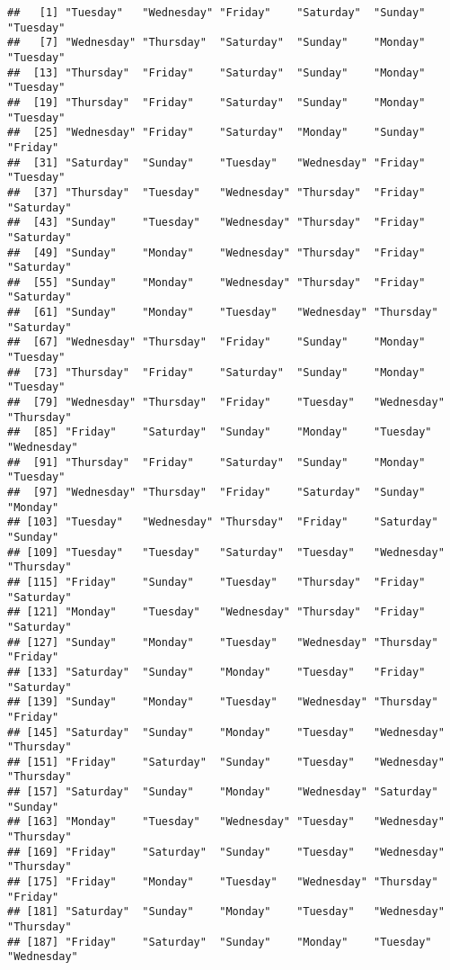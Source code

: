 \documentclass[
]{article}
\begin{document}
\begin{verbatim}
##   [1] "Tuesday"   "Wednesday" "Friday"    "Saturday"  "Sunday"    "Tuesday"  
##   [7] "Wednesday" "Thursday"  "Saturday"  "Sunday"    "Monday"    "Tuesday"  
##  [13] "Thursday"  "Friday"    "Saturday"  "Sunday"    "Monday"    "Tuesday"  
##  [19] "Thursday"  "Friday"    "Saturday"  "Sunday"    "Monday"    "Tuesday"  
##  [25] "Wednesday" "Friday"    "Saturday"  "Monday"    "Sunday"    "Friday"   
##  [31] "Saturday"  "Sunday"    "Tuesday"   "Wednesday" "Friday"    "Tuesday"  
##  [37] "Thursday"  "Tuesday"   "Wednesday" "Thursday"  "Friday"    "Saturday" 
##  [43] "Sunday"    "Tuesday"   "Wednesday" "Thursday"  "Friday"    "Saturday" 
##  [49] "Sunday"    "Monday"    "Wednesday" "Thursday"  "Friday"    "Saturday" 
##  [55] "Sunday"    "Monday"    "Wednesday" "Thursday"  "Friday"    "Saturday" 
##  [61] "Sunday"    "Monday"    "Tuesday"   "Wednesday" "Thursday"  "Saturday" 
##  [67] "Wednesday" "Thursday"  "Friday"    "Sunday"    "Monday"    "Tuesday"  
##  [73] "Thursday"  "Friday"    "Saturday"  "Sunday"    "Monday"    "Tuesday"  
##  [79] "Wednesday" "Thursday"  "Friday"    "Tuesday"   "Wednesday" "Thursday" 
##  [85] "Friday"    "Saturday"  "Sunday"    "Monday"    "Tuesday"   "Wednesday"
##  [91] "Thursday"  "Friday"    "Saturday"  "Sunday"    "Monday"    "Tuesday"  
##  [97] "Wednesday" "Thursday"  "Friday"    "Saturday"  "Sunday"    "Monday"   
## [103] "Tuesday"   "Wednesday" "Thursday"  "Friday"    "Saturday"  "Sunday"   
## [109] "Tuesday"   "Tuesday"   "Saturday"  "Tuesday"   "Wednesday" "Thursday" 
## [115] "Friday"    "Sunday"    "Tuesday"   "Thursday"  "Friday"    "Saturday" 
## [121] "Monday"    "Tuesday"   "Wednesday" "Thursday"  "Friday"    "Saturday" 
## [127] "Sunday"    "Monday"    "Tuesday"   "Wednesday" "Thursday"  "Friday"   
## [133] "Saturday"  "Sunday"    "Monday"    "Tuesday"   "Friday"    "Saturday" 
## [139] "Sunday"    "Monday"    "Tuesday"   "Wednesday" "Thursday"  "Friday"   
## [145] "Saturday"  "Sunday"    "Monday"    "Tuesday"   "Wednesday" "Thursday" 
## [151] "Friday"    "Saturday"  "Sunday"    "Tuesday"   "Wednesday" "Thursday" 
## [157] "Saturday"  "Sunday"    "Monday"    "Wednesday" "Saturday"  "Sunday"   
## [163] "Monday"    "Tuesday"   "Wednesday" "Tuesday"   "Wednesday" "Thursday" 
## [169] "Friday"    "Saturday"  "Sunday"    "Tuesday"   "Wednesday" "Thursday" 
## [175] "Friday"    "Monday"    "Tuesday"   "Wednesday" "Thursday"  "Friday"   
## [181] "Saturday"  "Sunday"    "Monday"    "Tuesday"   "Wednesday" "Thursday" 
## [187] "Friday"    "Saturday"  "Sunday"    "Monday"    "Tuesday"   "Wednesday"

\end{verbatim}
\end{document}
